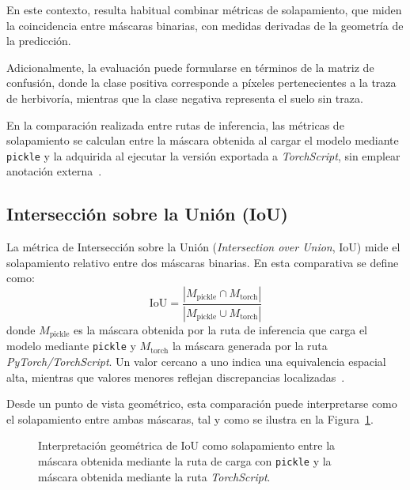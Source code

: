 En este contexto, resulta habitual combinar métricas de solapamiento, que miden la coincidencia entre máscaras binarias, con medidas derivadas de la geometría de la predicción.

Adicionalmente, la evaluación puede formularse en términos de la matriz de confusión, donde la clase positiva corresponde a píxeles pertenecientes a la traza de herbivoría, mientras que la clase negativa representa el suelo sin traza.

En la comparación realizada entre rutas de inferencia, las métricas de solapamiento se calculan entre la máscara obtenida al cargar el modelo mediante \texttt{pickle} y la adquirida al ejecutar la versión exportada a \textit{TorchScript}, sin emplear anotación externa~\cite{paszke2019pytorch}.

\subsection{Intersección sobre la Unión (IoU)}
La métrica de Intersección sobre la Unión (\textit{Intersection over Union}, IoU) mide el solapamiento relativo entre dos máscaras binarias. En esta comparativa se define como:
\begin{equation}
	\mathrm{IoU} = \frac{|M_{\text{pickle}} \cap M_{\text{torch}}|}{|M_{\text{pickle}} \cup M_{\text{torch}}|}
\end{equation}
donde \(M_{\text{pickle}}\) es la máscara obtenida por la ruta de inferencia que carga el modelo mediante \texttt{pickle} y \(M_{\text{torch}}\) la máscara generada por la ruta \textit{PyTorch/TorchScript}. Un valor cercano a uno indica una equivalencia espacial alta, mientras que valores menores reflejan discrepancias localizadas~\cite{minaee2022segmentationSurvey,Dimitrovski2024,TahaHanbury2015}.

Desde un punto de vista geométrico, esta comparación puede interpretarse como el solapamiento entre ambas máscaras, tal y como se ilustra en la Figura~\ref{fig:iou-venn}.

\begin{figure}[H]
	\centering
	\caption[Interpretación geométrica de IoU.]{Interpretación geométrica de IoU como solapamiento entre la máscara obtenida mediante la ruta de carga con \texttt{pickle} y la máscara obtenida mediante la ruta \textit{TorchScript}.}
	\label{fig:iou-venn}
\end{figure}

